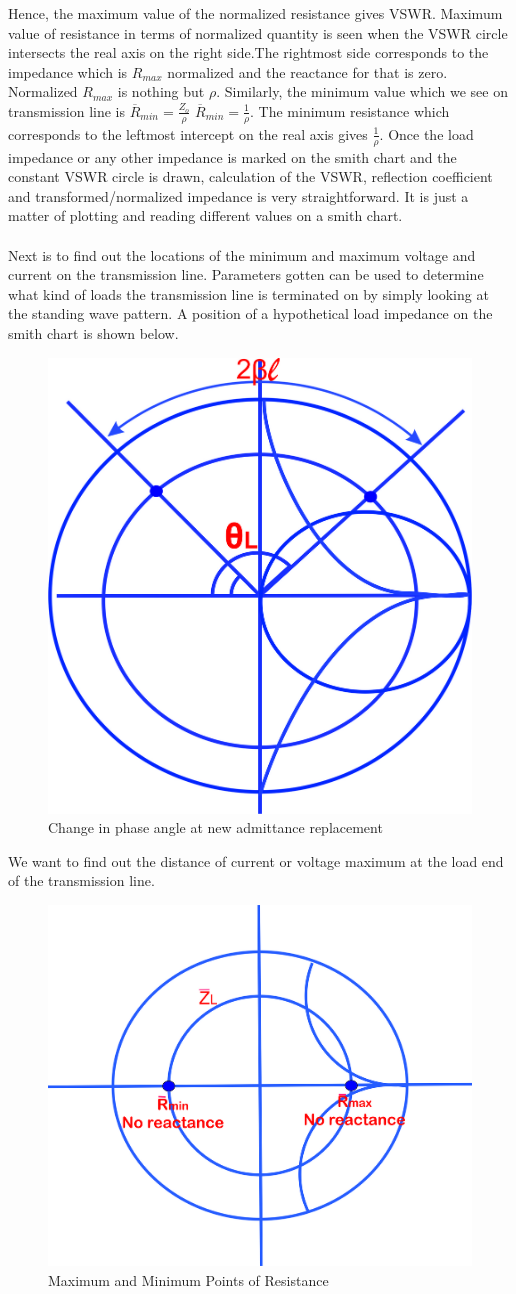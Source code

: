   Hence, the maximum value of the normalized resistance gives VSWR. Maximum value of resistance in terms of normalized quantity is seen when the VSWR circle intersects the real axis on the right side.The rightmost side corresponds to the impedance which is $R_{max}$ normalized and the reactance for that is zero. Normalized $R_{max}$ is nothing but $\rho$. Similarly, the minimum value which we see on transmission line is $\overline{R}_{min} = \frac{Z_o}{\rho}$ $\overline{R}_{min} = \frac{1}{\rho}$. The minimum resistance which corresponds to the leftmost intercept on the real axis gives $\frac{1}{\rho}$. Once the load impedance or any other impedance is marked on the smith chart and the constant VSWR circle is drawn, calculation of the VSWR, reflection coefficient and transformed/normalized impedance is very straightforward. It is just a matter of plotting and reading different values on a smith chart.\\\\
  Next is to find out the locations of the  minimum and maximum voltage and current on the transmission line. Parameters gotten can be used to determine what kind of loads the transmission line is terminated on by simply looking at the standing wave pattern. A position of a hypothetical load impedance on the smith chart is shown below.
\begin{figure}[h]
\centering
\includegraphics[width=0.4\linewidth]{./graphics/dfyui}
\caption{Change in phase angle at new admittance replacement}
\label{fig:dfyui}
\end{figure}

 
We want to find out the distance of current or voltage maximum at the load end of the transmission line.
\begin{figure}[h]
\centering
\includegraphics[width=0.7\linewidth]{./graphics/oijhgfdsa}
\caption{Maximum and Minimum Points of Resistance}
\label{fig:oijhgfdsa}
\end{figure}

